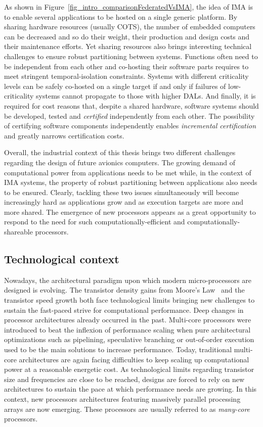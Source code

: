 \documentclass[main.tex]{subfiles}
\begin{document}
As shown in Figure~\ref{fig_intro_comparisonFederatedVsIMA}, the idea of IMA is
to enable several applications to be hosted on a single generic platform. By
sharing hardware resources (usually COTS), the number of embedded computers can
be decreased and so do their weight, their production and design costs and
their maintenance efforts. Yet sharing resources also brings interesting
technical challenges to ensure robust partitioning between systems. Functions
often need to be independent from each other and co-hosting their software
parts requires to meet stringent temporal-isolation constraints. Systems with
different criticality levels can be safely co-hosted on a single target if and
only if failures of low-criticality systems cannot propagate to those with
higher DALs. And finally, it is required for cost reasons that, despite a
shared hardware, software systems should be developed, tested and
\emph{certified} independently from each other. The possibility of certifying
software components independently enables \emph{incremental certification} and
greatly narrows certification costs.

Overall, the industrial context of this thesis brings two different challenges
regarding the design of future avionics computers. The growing demand of
computational power from applications needs to be met while, in the context of
IMA systems, the property of robust partitioning between applications also
needs to be ensured. Clearly, tackling these two issues simultaneously will
become increasingly hard as applications grow and as execution targets are more
and more shared. The emergence of new processors appears as a great opportunity
to respond to the need for such computationally-efficient and
computationally-shareable processors.




\subsection{Technological context}
Nowadays, the architectural paradigm upon which modern micro-processors are
designed is evolving. The transistor density gains from Moore's
Law~\cite{Moore1975} and the transistor speed growth both face technological
limits bringing new challenges to sustain the fast-paced strive for
computational performance. Deep changes in processor architectures already
occurred in the past. Multi-core processors were introduced to beat the
inflexion of performance scaling when pure architectural optimizations such as
pipelining, speculative branching or out-of-order execution used to be the main
solutions to increase performance.  Today, traditional multi-core architectures
are again facing difficulties to keep scaling up computational power at a
reasonable energetic cost. As technological limits regarding transistor size
and frequencies are close to be reached, designs are forced to rely on new
architectures to sustain the pace at which performance needs are growing. In
this context, new processors architectures featuring massively parallel
processing arrays are now emerging. These processors are usually referred to as
\emph{many-core} processors.
\end{document}
